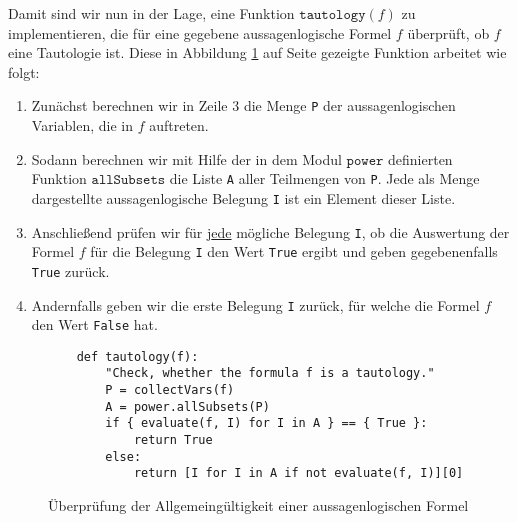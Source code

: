 Damit sind wir nun in der Lage, eine Funktion $\mathtt{tautology}(f)$ zu implementieren, die für eine gegebene
aussagenlogische Formel $f$ überprüft, ob $f$ eine Tautologie ist.  Diese in Abbildung \ref{fig:tautology.py} auf Seite \pageref{fig:tautology.py}
gezeigte Funktion arbeitet wie folgt:
\begin{enumerate}
\item Zunächst berechnen wir in Zeile 3 die Menge \texttt{P} der aussagenlogischen Variablen, die in $f$ auftreten.
\item Sodann berechnen wir mit Hilfe der in dem Modul $\mathtt{power}$ definierten Funktion
      $\mathtt{allSubsets}$ die Liste \texttt{A} aller Teilmengen von \texttt{P}.  Jede als Menge dargestellte
      aussagenlogische Belegung \texttt{I} ist ein Element dieser Liste.
\item Anschließend prüfen wir für j\underline{ede} mögliche Belegung \texttt{I}, ob die Auswertung der Formel $f$ für die
      Belegung \texttt{I} den Wert \texttt{True} ergibt und geben gegebenenfalls \texttt{True} zurück.
\item Andernfalls geben wir die erste Belegung \texttt{I} zurück, für welche die Formel $f$ den Wert
      \texttt{False} hat.
\end{enumerate}

\begin{figure}[!ht]
  \centering
\begin{verbatim}
    def tautology(f):
        "Check, whether the formula f is a tautology."
        P = collectVars(f)
        A = power.allSubsets(P)
        if { evaluate(f, I) for I in A } == { True }:
            return True
        else:
            return [I for I in A if not evaluate(f, I)][0]
\end{verbatim}
\vspace*{-0.3cm}
  \caption{Überprüfung der Allgemeingültigkeit einer aussagenlogischen Formel}
  \label{fig:tautology.py}
\end{figure}

